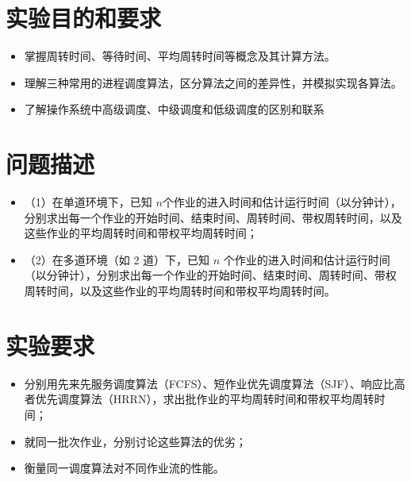 \documentclass[12pt,hyperref,a4paper,UTF8]{ctexart}
\begin{document}
\cover

%
%

\thispagestyle{empty} %


\newpage


\section{实验目的和要求}
\begin{itemize}
    \item 掌握周转时间、等待时间、平均周转时间等概念及其计算方法。
    \item 理解三种常用的进程调度算法，区分算法之间的差异性，并模拟实现各算法。
    \item 了解操作系统中高级调度、中级调度和低级调度的区别和联系
\end{itemize}

\section{问题描述}
    \begin{itemize}
        \item （1）在单道环境下，已知 $n$个作业的进入时间和估计运行时间（以分钟计），分别求出每一个作业的开始时间、结束时间、周转时间、带权周转时间，以及这些作业的平均周转时间和带权平均周转时间；
        \item （2）在多道环境（如 2 道）下，已知 $n$ 个作业的进入时间和估计运行时间（以分钟计），分别求出每一个作业的开始时间、结束时间、周转时间、带权周转时间，以及这些作业的平均周转时间和带权平均周转时间。
    \end{itemize}

\section{实验要求}
    \begin{itemize}
        \item 分别用先来先服务调度算法（FCFS）、短作业优先调度算法（SJF）、响应比高者优先调度算法（HRRN），求出批作业的平均周转时间和带权平均周转时间；
        \item 就同一批次作业，分别讨论这些算法的优劣；
        \item 衡量同一调度算法对不同作业流的性能。
    \end{itemize}
\end{document}
